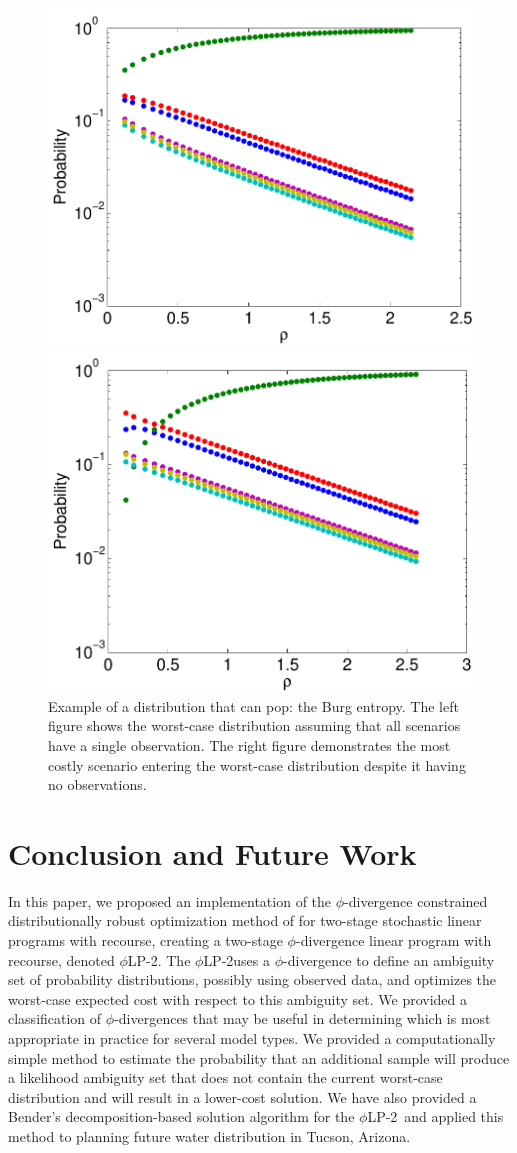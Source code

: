 \documentclass[ijoc,letterpaper]{informs3} %
\newcommand{\plp}{$\phi$LP-2}
\begin{document}
\begin{figure}
	\FIGURE
	{%
		\includegraphics*[width=.5\textwidth]{images/burg}%
		\includegraphics*[width=.5\textwidth]{images/burg_zero}%
	}
	{
		Example of a distribution that can pop: the Burg entropy.
		The left figure shows the worst-case distribution assuming that all scenarios have a single observation.
		The right figure demonstrates the most costly scenario entering the worst-case distribution despite it having no observations.
		\label{fig:pop}
	}
	{}
\end{figure}

\section{Conclusion and Future Work}
\label{sec:concl}

In this paper, we proposed an implementation of the $\phi$-divergence constrained distributionally robust optimization method of \cite{bental2011robust} for two-stage stochastic linear programs with recourse, creating a two-stage $\phi$-divergence linear program with recourse, denoted \plp.
The \plp uses a $\phi$-divergence to define an ambiguity set of probability distributions, possibly using observed data, and optimizes the worst-case expected cost with respect to this ambiguity set.
We provided a classification of $\phi$-divergences that may be useful in determining which is most appropriate in practice for several model types.
We provided a computationally simple method to estimate the probability that an additional sample will produce a likelihood ambiguity set that does not contain the current worst-case distribution and will result in a lower-cost solution. 
We have also provided a Bender's decomposition-based solution algorithm for the \plp\ and applied this method to planning future water distribution in Tucson, Arizona.
\end{document}
